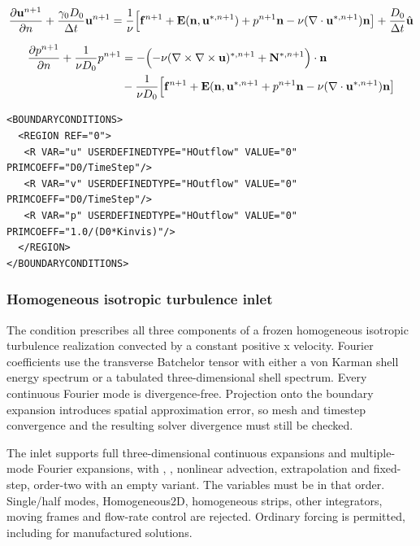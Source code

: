 \begin{equation}
  \frac{\partial \mathbf{u}^{n+1}}{\partial n} + \frac{\gamma_0 D_0}{\Delta t} \mathbf{u}^{n+1} = \frac{1}{\nu}\Bigl[\mathbf{f}^{n+1} + \mathbf{E}(\mathbf{n},\mathbf{u}^{*,n+1}) + p^{n+1}\mathbf{n} -\nu(\nabla\cdot \mathbf{u}^{*,n+1}) \mathbf{n}
    \bigr] + \frac{D_0}{\Delta t}\hat{\mathbf{u}}
 \end{equation}

\begin{align}
  \frac{\partial p^{n+1}}{\partial n} + \frac{1}{\nu D_0} p^{n+1} &=
   - \Bigl( -\nu (\nabla \times \nabla \times   \mathbf{u})^{*,n+1} + \mathbf{N}^{*,n+1}\Bigr)\cdot \mathbf{n} \nonumber \\
 & - \frac{1}{\nu D_0}\Bigl[\mathbf{f}^{n+1} + \mathbf{E}(\mathbf{n},\mathbf{u}^{*,n+1} + p^{n+1}\mathbf{n} -\nu(\nabla\cdot \mathbf{u}^{*,n+1}) \mathbf{n}
   \bigr] 
 \end{align}


\begin{lstlisting}[style=XMLStyle]
<BOUNDARYCONDITIONS>
  <REGION REF="0">
   <R VAR="u" USERDEFINEDTYPE="HOutflow" VALUE="0" PRIMCOEFF="D0/TimeStep"/>
   <R VAR="v" USERDEFINEDTYPE="HOutflow" VALUE="0" PRIMCOEFF="D0/TimeStep"/>
   <R VAR="p" USERDEFINEDTYPE="HOutflow" VALUE="0" PRIMCOEFF="1.0/(D0*Kinvis)"/>
  </REGION>
</BOUNDARYCONDITIONS>
\end{lstlisting}

\subsubsection{Homogeneous isotropic turbulence inlet}
\label{sec:hit-inflow}

The  condition prescribes all three components of a frozen
homogeneous isotropic turbulence realization convected by a constant positive
x velocity. Fourier coefficients use the transverse Batchelor tensor with
either a von Karman shell energy spectrum or a tabulated three-dimensional
shell spectrum. Every continuous Fourier mode is divergence-free. Projection
onto the boundary expansion introduces spatial approximation error, so mesh
and timestep convergence and the resulting solver divergence must still be
checked.

The inlet supports full three-dimensional continuous expansions and
multiple-mode  Fourier expansions, with
, ,
nonlinear advection,  extrapolation and fixed-step, order-two
 with an empty variant. The variables must be  in
that order. Single/half modes, Homogeneous2D, homogeneous strips, other
integrators, moving frames and flow-rate control are rejected.
Ordinary  forcing is permitted,
including for manufactured solutions.

